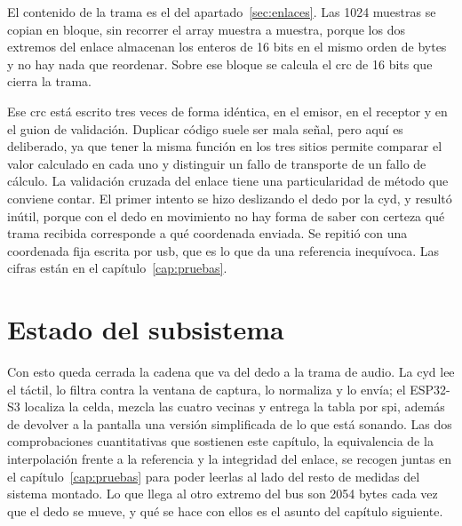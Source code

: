 El contenido de la trama es el del apartado~\ref{sec:enlaces}. Las 1024 muestras
se copian en bloque, sin recorrer el array muestra a muestra, porque los dos
extremos del enlace almacenan los enteros de 16 bits en el mismo orden de bytes
y no hay nada que reordenar. Sobre ese bloque se calcula el \gls{crc} de 16 bits
que cierra la trama.

Ese \gls{crc} está escrito tres veces de forma idéntica, en el emisor, en el
receptor y en el guion de validación. Duplicar código suele ser mala señal, pero
aquí es deliberado, ya que tener la misma función en los tres sitios permite
comparar el valor calculado en cada uno y distinguir un fallo de transporte de
un fallo de cálculo. La validación cruzada del enlace tiene una particularidad de
método que conviene contar. El primer intento se hizo deslizando el dedo por la
\gls{cyd}, y resultó inútil, porque con el dedo en movimiento no hay forma de
saber con certeza qué trama recibida corresponde a qué coordenada enviada. Se
repitió con una coordenada fija escrita por \gls{usb}, que es lo que da una
referencia inequívoca. Las cifras están en el capítulo~\ref{cap:pruebas}.

\section{Estado del subsistema}

Con esto queda cerrada la cadena que va del dedo a la trama de audio. La
\gls{cyd} lee el táctil, lo filtra contra la ventana de captura, lo normaliza y
lo envía; el ESP32-S3 localiza la celda, mezcla las cuatro vecinas y entrega la
tabla por \gls{spi}, además de devolver a la pantalla una versión simplificada de lo
que está sonando. Las dos comprobaciones cuantitativas que sostienen este
capítulo, la equivalencia de la interpolación frente a la referencia y la
integridad del enlace, se recogen juntas en el capítulo~\ref{cap:pruebas} para
poder leerlas al lado del resto de medidas del sistema montado. Lo que llega al
otro extremo del bus son 2054 bytes cada vez que el dedo se mueve, y qué se hace
con ellos es el asunto del capítulo siguiente.

